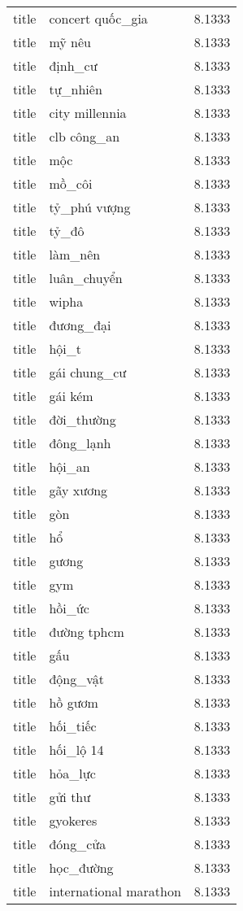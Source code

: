 \documentclass{article}
\begin{document}
\begin{tabular}{lll}
title & concert quốc\_gia & 8.1333\\
title & mỹ nêu & 8.1333\\
title & định\_cư & 8.1333\\
title & tự\_nhiên & 8.1333\\
title & city millennia & 8.1333\\
title & clb công\_an & 8.1333\\
title & mộc & 8.1333\\
title & mồ\_côi & 8.1333\\
title & tỷ\_phú vượng & 8.1333\\
title & tỷ\_đô & 8.1333\\
title & làm\_nên & 8.1333\\
title & luân\_chuyển & 8.1333\\
title & wipha & 8.1333\\
title & đương\_đại & 8.1333\\
title & hội\_t & 8.1333\\
title & gái chung\_cư & 8.1333\\
title & gái kém & 8.1333\\
title & đời\_thường & 8.1333\\
title & đông\_lạnh & 8.1333\\
title & hội\_an & 8.1333\\
title & gãy xương & 8.1333\\
title & gòn & 8.1333\\
title & hổ & 8.1333\\
title & gương & 8.1333\\
title & gym & 8.1333\\
title & hồi\_ức & 8.1333\\
title & đường tphcm & 8.1333\\
title & gấu & 8.1333\\
title & động\_vật & 8.1333\\
title & hồ gươm & 8.1333\\
title & hối\_tiếc & 8.1333\\
title & hối\_lộ 14 & 8.1333\\
title & hỏa\_lực & 8.1333\\
title & gửi thư & 8.1333\\
title & gyokeres & 8.1333\\
title & đóng\_cửa & 8.1333\\
title & học\_đường & 8.1333\\
title & international marathon & 8.1333\\

\end{tabular}
\end{document}
